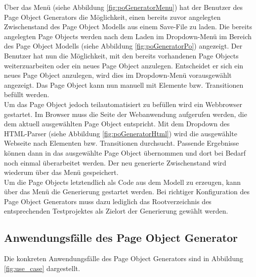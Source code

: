 Über das Menü (siehe Abbildung \ref{fig:poGeneratorMenu}) hat der Benutzer des Page Object Generators die Möglichkeit, einen bereits zuvor angelegten Zwischenstand des Page Object Modells aus einem Save-File zu laden. Die bereits angelegten Page Objects werden nach dem Laden im Dropdown-Menü im Bereich des Page Object Modells (siehe Abbildung \ref{fig:poGeneratorPo}) angezeigt. Der Benutzer hat nun die Möglichkeit, mit den bereits vorhandenen Page Objects weiterzuarbeiten oder ein neues Page Object anzulegen. Entscheidet er sich ein neues Page Object anzulegen, wird dies im Dropdown-Menü vorausgewählt angezeigt. Das Page Object kann nun manuell mit Elemente bzw. Transitionen befüllt werden.\\ Um das Page Object jedoch teilautomatisiert zu befüllen wird ein Webbrowser gestartet. Im Browser muss die Seite der Webanwendung aufgerufen werden, die dem aktuell ausgewählten Page Object entspricht. Mit dem Dropdown des HTML-Parser (siehe Abbildung \ref{fig:poGeneratorHtml}) wird die ausgewählte Webseite nach Elementen bzw. Transitionen durchsucht.
Passende Ergebnisse können dann in das ausgewählte Page Object übernommen und dort bei Bedarf noch einmal überarbeitet werden.
Der neu generierte Zwischenstand wird wiederum über das Menü gespeichert.\\
Um die Page Objects letztendlich als Code aus dem Modell zu erzeugen, kann über das Menü die Generierung gestartet werden. Bei richtiger Konfiguration des Page Object Generators muss dazu lediglich das Rootverzeichnis des entsprechenden Testprojektes als Zielort der Generierung gewählt werden.


\subsection{Anwendungsfälle des Page Object Generator}
\label{sec:page_object_generator_usecases}

Die konkreten Anwendungsfälle des Page Object Generators sind in Abbildung \ref{fig:use_case} dargestellt.

